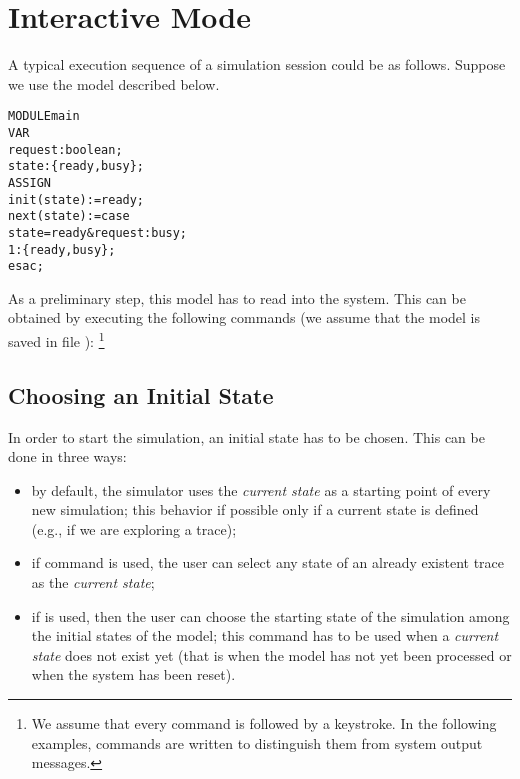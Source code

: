 \section{Interactive Mode}
\label{Interactive Mode}

A typical execution sequence of a simulation session could be as follows. Suppose
we use the model described below.\\
\begin{alltt}
MODULE main
VAR
  request : boolean;
  state : \{ready,busy\};
ASSIGN
  init(state) := ready;
  next(state) := case
                   state = ready & request : busy;
                   1                       : \{ready,busy\};
                 esac;
\end{alltt}

As a preliminary step, this model has to read into the \nusmv system.
This can be obtained by executing the following commands (we assume that the model is
saved in file ):
\footnote{We assume that every \nusmv command is followed by a
\ret keystroke. In the following examples,
\nusmv commands are written {} to
distinguish them from system output messages.}
\begin{alltt}
\shellprompt {}
\nusmvprompt {}
\nusmvprompt
\end{alltt}

\subsection{Choosing an Initial State}
\label{Choosing an Initial State}
In order to start the simulation, an initial state has to be
chosen. This can be done in three ways:
\begin{itemize}
\item by default, the simulator uses the \emph{current state} as a 
starting point of every new simulation; this behavior if possible only
if a current state is defined (e.g., if we are exploring a trace);
\item if command  is used,
the user can select any state of an already existent
trace as the \emph{current state};
\item if  is used, then 
the user can choose the starting state of the simulation among the
initial states of the model; this command has to be used when a
\emph{current state} does not exist yet (that is when the model has
not yet been processed or when the system has been reset).
\end{itemize}

